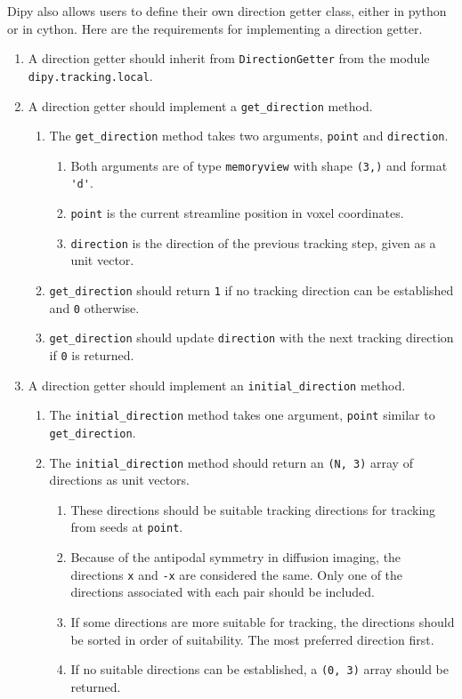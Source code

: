 Dipy also allows users to define their own direction getter class, either in python or in cython. Here are the requirements for implementing a direction getter.
\begin{enumerate}
\item A direction getter should inherit from \verb|DirectionGetter| from the module \verb|dipy.tracking.local|.
\item A direction getter should implement a \verb|get_direction| method.
\begin{enumerate}
\item The \verb|get_direction| method takes two arguments, \verb|point| and \verb|direction|.
\begin{enumerate}
\item Both arguments are of type \verb|memoryview| with shape \verb|(3,)| and format \verb|'d'|.
\item \verb|point| is the current streamline position in voxel coordinates.
\item \verb|direction| is the direction of the previous tracking step, given as a unit vector.
\end{enumerate}
\item \verb|get_direction| should return \verb|1| if no tracking direction can be established and \verb|0| otherwise.
\item \verb|get_direction| should update \verb|direction| with the next tracking direction if \verb|0| is returned.
\end{enumerate}
\item A direction getter should implement an \verb|initial_direction| method.
\begin{enumerate}
\item The \verb|initial_direction| method takes one argument, \verb|point| similar to \verb|get_direction|.
\item The \verb|initial_direction| method should return an \verb|(N, 3)| array of directions as unit vectors.
\begin{enumerate}
\item These directions should be suitable tracking directions for tracking from seeds at \verb|point|.
\item Because of the antipodal symmetry in diffusion imaging, the directions \verb|x| and \verb|-x| are considered the same. Only one of the directions associated with each pair should be included.
\item If some directions are more suitable for tracking, the directions should be sorted in order of suitability. The most preferred direction first.  
\item If no suitable directions can be established, a \verb|(0, 3)| array should be returned.
\end{enumerate}
\end{enumerate}
\end{enumerate}

